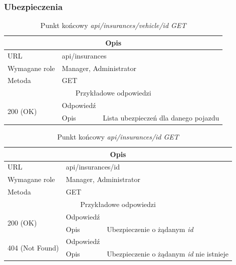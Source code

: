 \documentclass[eng,printmode,openany]{mgr}
\begin{document}
\subsubsection{Ubezpieczenia}
\begin{table}[H]
	\caption{Punkt końcowy \textit{api/insurances/vehicle/id GET}}
	\begin{tabularx}{\textwidth}{|l|l|X|}
		\hline
		\multicolumn{3}{|c|}{Opis}                         						\\ \hline
		URL                       & \multicolumn{2}{l|}{api/insurances} 	    \\ \hline
		Wymagane role             & \multicolumn{2}{l|}{Manager, Administrator}               \\ \hline
		Metoda                    & \multicolumn{2}{l|}{GET} 					\\ \hline
		\multicolumn{3}{|c|}{ Przykładowe odpowiedzi}                   		\\ \hline
		\multirow{2}{*}{200 (OK)} 			& Odpowiedź     &        \\ \cline{2-3} 
		& Opis         	& Lista ubezpieczeń dla danego pojazdu		      		                            \\ \hline
	\end{tabularx}
\end{table}

\begin{table}[H]
	\caption{Punkt końcowy \textit{api/insurances/id GET}}
	\begin{tabularx}{\textwidth}{|l|l|X|}
		\hline
		\multicolumn{3}{|c|}{Opis}                         						\\ \hline
		URL                       & \multicolumn{2}{l|}{api/insurances/id} 	    \\ \hline
		Wymagane role             & \multicolumn{2}{l|}{Manager, Administrator}               \\ \hline
		Metoda                    & \multicolumn{2}{l|}{GET} 					\\ \hline
		\multicolumn{3}{|c|}{ Przykładowe odpowiedzi}                   		\\ \hline
		\multirow{2}{*}{200 (OK)} 			& Odpowiedź    	&         	\\ \cline{2-3} 
		& Opis         	& Ubezpieczenie o żądanym \textit{id}      									                \\ \hline
		\multirow{2}{*}{404 (Not Found)} 	& Odpowiedź     &      \\ \cline{2-3} 
		& Opis          & Ubezpieczenie o żądanym \textit{id} nie istnieje      									\\ \hline
	\end{tabularx}
\end{table}
\end{document}
